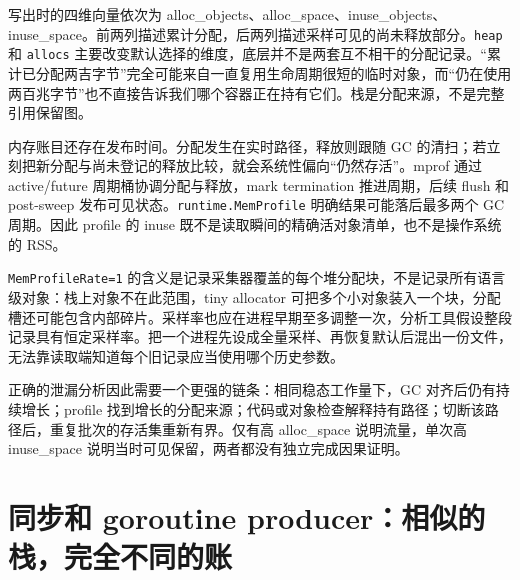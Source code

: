 \documentclass[UTF8,fontset=fandol,openany,11pt]{ctexbook}
\begin{document}
写出时的四维向量依次为 alloc\_\allowbreak{}objects、alloc\_\allowbreak{}space、inuse\_\allowbreak{}objects、inuse\_\allowbreak{}space。前两列描述累计分配，后两列描述采样可见的尚未释放部分。\texttt{heap} 和 \texttt{allocs} 主要改变默认选择的维度，底层并不是两套互不相干的分配记录。“累计已分配两吉字节”完全可能来自一直复用生命周期很短的临时对象，而“仍在使用两百兆字节”也不直接告诉我们哪个容器正在持有它们。栈是分配来源，不是完整引用保留图。\cite{pp-heap-scale}\cite{pp-profile-kinds}


内存账目还存在发布时间。分配发生在实时路径，释放则跟随 GC 的清扫；若立刻把新分配与尚未登记的释放比较，就会系统性偏向“仍然存活”。mprof 通过 active/future 周期桶协调分配与释放，mark termination 推进周期，后续 flush 和 post-sweep 发布可见状态。\texttt{runtime.\allowbreak{}MemProfile} 明确结果可能落后最多两个 GC 周期。因此 profile 的 inuse 既不是读取瞬间的精确活对象清单，也不是操作系统的 RSS。\cite{pp-mprof}


\texttt{MemProfileRate=1} 的含义是记录采集器覆盖的每个堆分配块，不是记录所有语言级对象：栈上对象不在此范围，tiny allocator 可把多个小对象装入一个块，分配槽还可能包含内部碎片。采样率也应在进程早期至多调整一次，分析工具假设整段记录具有恒定采样率。把一个进程先设成全量采样、再恢复默认后混出一份文件，无法靠读取端知道每个旧记录应当使用哪个历史参数。\cite{pp-mprof}\cite{pp-heap-coverage}


正确的泄漏分析因此需要一个更强的链条：相同稳态工作量下，GC 对齐后仍有持续增长；profile 找到增长的分配来源；代码或对象检查解释持有路径；切断该路径后，重复批次的存活集重新有界。仅有高 alloc\_\allowbreak{}space 说明流量，单次高 inuse\_\allowbreak{}space 说明当时可见保留，两者都没有独立完成因果证明。\cite{pp-profile-kinds}\cite{pp-mprof}


\section{同步和 goroutine producer：相似的栈，完全不同的账}
\end{document}
